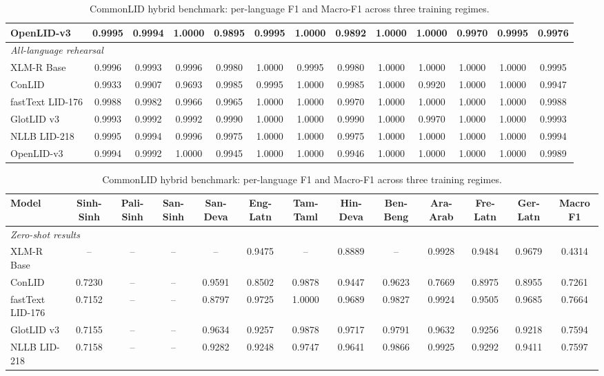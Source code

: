 \begin{table}[p]
\begin{tabular}{l ccc cccccccc c}
OpenLID-v3 & 0.9995 & 0.9994 & 1.0000 & 0.9895 & 0.9995 & 1.0000 & 0.9892 & 1.0000 & 1.0000 & 0.9970 & 0.9995 & 0.9976 \\
\midrule
\multicolumn{13}{l}{\textit{All-language rehearsal}} \\
XLM-R Base & 0.9996 & 0.9993 & 0.9996 & 0.9980 & 1.0000 & 0.9995 & 0.9980 & 1.0000 & 1.0000 & 1.0000 & 1.0000 & 0.9995 \\
ConLID & 0.9933 & 0.9907 & 0.9693 & 0.9985 & 0.9995 & 1.0000 & 0.9985 & 1.0000 & 0.9920 & 1.0000 & 1.0000 & 0.9947 \\
fastText LID-176 & 0.9988 & 0.9982 & 0.9966 & 0.9965 & 1.0000 & 1.0000 & 0.9970 & 1.0000 & 1.0000 & 1.0000 & 1.0000 & 0.9988 \\
GlotLID v3 & 0.9993 & 0.9992 & 0.9992 & 0.9990 & 1.0000 & 1.0000 & 0.9990 & 1.0000 & 0.9970 & 1.0000 & 1.0000 & 0.9993 \\
NLLB LID-218 & 0.9995 & 0.9994 & 0.9996 & 0.9975 & 1.0000 & 1.0000 & 0.9975 & 1.0000 & 1.0000 & 1.0000 & 1.0000 & 0.9994 \\
OpenLID-v3 & 0.9994 & 0.9992 & 1.0000 & 0.9945 & 1.0000 & 1.0000 & 0.9946 & 1.0000 & 1.0000 & 1.0000 & 1.0000 & 0.9989 \\
\bottomrule
\end{tabular}
\vspace{4pt}
\caption{CommonLID hybrid benchmark: per-language F1 and Macro-F1 across three training regimes.}
\label{tab:common_full}
\begin{tabular}{l ccc cccccccc c}
\toprule
\textbf{Model} & \textbf{Sinh-Sinh} & \textbf{Pali-Sinh} & \textbf{San-Sinh} & \textbf{San-Deva} & \textbf{Eng-Latn} & \textbf{Tam-Taml} & \textbf{Hin-Deva} & \textbf{Ben-Beng} & \textbf{Ara-Arab} & \textbf{Fre-Latn} & \textbf{Ger-Latn} & \textbf{Macro F1} \\
\midrule
\multicolumn{13}{l}{\textit{Zero-shot results}} \\
XLM-R Base & -- & -- & -- & -- & 0.9475 & -- & 0.8889 & -- & 0.9928 & 0.9484 & 0.9679 & 0.4314 \\
ConLID & 0.7230 & -- & -- & 0.9591 & 0.8502 & 0.9878 & 0.9447 & 0.9623 & 0.7669 & 0.8975 & 0.8955 & 0.7261 \\
fastText LID-176 & 0.7152 & -- & -- & 0.8797 & 0.9725 & 1.0000 & 0.9689 & 0.9827 & 0.9924 & 0.9505 & 0.9685 & 0.7664 \\
GlotLID v3 & 0.7155 & -- & -- & 0.9634 & 0.9257 & 0.9878 & 0.9717 & 0.9791 & 0.9632 & 0.9256 & 0.9218 & 0.7594 \\
NLLB LID-218 & 0.7158 & -- & -- & 0.9282 & 0.9248 & 0.9747 & 0.9641 & 0.9866 & 0.9925 & 0.9292 & 0.9411 & 0.7597 \\

\end{tabular}
\end{table}

